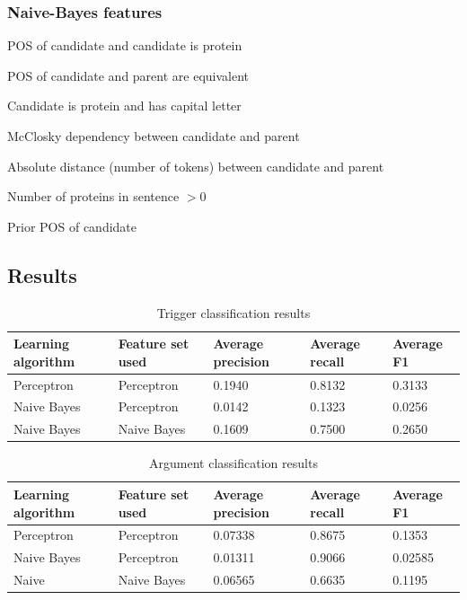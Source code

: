 \documentclass{article} %
\begin{document}
\subsubsection{Naive-Bayes features}

\begin{itemize*}

\item POS of candidate and candidate is protein
\item POS of candidate and parent are equivalent
\item Candidate is protein and has capital letter
\item McClosky dependency between candidate and parent
\item Absolute distance (number of tokens) between candidate and parent
\item Number of proteins in sentence $> 0$
\item Prior POS of candidate

\end{itemize*}

\subsection{Results}

\begin{table}[hbt]
\centering
\caption{Trigger classification results}
\label{trigger_results_3}
\begin{tabular}{|l|l|l|l|l|}
\hline
Learning algorithm & Feature set used & Average precision & Average recall & Average F1 \\ \hline
Perceptron         & Perceptron       & 0.1940            & 0.8132         & 0.3133     \\ \hline
Naive Bayes        & Perceptron       & 0.0142            & 0.1323         & 0.0256     \\ \hline
Naive Bayes        & Naive Bayes      & 0.1609            & 0.7500         & 0.2650     \\ \hline
\end{tabular}
\end{table}

\begin{table}[hbt]
	\centering
	\caption{Argument classification results}
	\label{argument_results_3}
	\begin{tabular}{|l|l|l|l|l|}
		\hline
		Learning algorithm & Feature set used & Average precision & Average recall & Average F1 \\ \hline
		Perceptron         & Perceptron       & 0.07338           & 0.8675         & 0.1353     \\ \hline
		Naive Bayes        & Perceptron       & 0.01311           & 0.9066         & 0.02585    \\ \hline
		Naive              & Naive Bayes      & 0.06565           & 0.6635         & 0.1195     \\ \hline
	\end{tabular}
\end{table}
\end{document}
